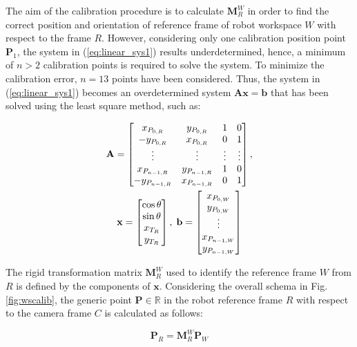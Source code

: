 \documentclass[a4paper, 10 pt, conference]{ieeeconf}      %
\begin{document}
The aim of the calibration procedure is to calculate $\mathbf{M}^W_{R}$ in order to find the correct position and orientation of reference frame of robot workspace $W$ with respect to the frame $R$. However, considering only one calibration position point $\mathbf{P}_1$, the system in (\ref{eq:linear_sys1}) results underdetermined, hence, a minimum of $n>2$ calibration points is required to solve the system. To minimize the calibration error, $n=13$ points have been considered. Thus, the system in (\ref{eq:linear_sys1}) becomes an overdetermined system $\mathbf{A}\mathbf{x}=\mathbf{b}$ that has been solved using the least square method, such as:

\begin{equation}\label{eq:linear_sys2}
\begin{gathered}
\mathbf{A} = \begin{bmatrix}
x_{P_{0,R}} & y_{P_{0,R}} & 1 & 0\\
-y_{P_{0,R}} & x_{P_{0,R}} & 0 & 1 \\
\vdots & \vdots & \vdots & \vdots\\
x_{P_{n-1,R}} & y_{P_{n-1,R}} & 1 & 0\\
-y_{P_{n-1,R}} & x_{P_{n-1,R}} & 0 & 1 
\end{bmatrix} , \\ 
\mathbf{x} =   \begin{bmatrix}
\cos\theta\\
\sin\theta\\
x_{T_R}\\
y_{T_R}
\end{bmatrix},\thickspace
\mathbf{b} =   \begin{bmatrix}
x_{P_{0,W}}\\
y_{P_{0,W}}\\
\vdots\\
x_{P_{n-1,W}}\\
y_{P_{n-1,W}}\\
\end{bmatrix}
\end{gathered}
\end{equation}

The rigid transformation matrix $\mathbf{M}^W_{R}$ used to identify the reference frame $W$ from $R$ is defined by the components of $\mathbf{x}$.
Considering the overall schema in Fig. \ref{fig:wscalib}, the generic point $\mathbf{P}\in\mathbb{R}$ in the robot reference frame $R$ with respect to the camera frame $C$ is calculated as follows:

\begin{equation}\label{eq:roto1}
\mathbf{P}_{R} = \mathbf{M}^W_{R}\mathbf{P}_{W}
\end{equation}
\end{document}
